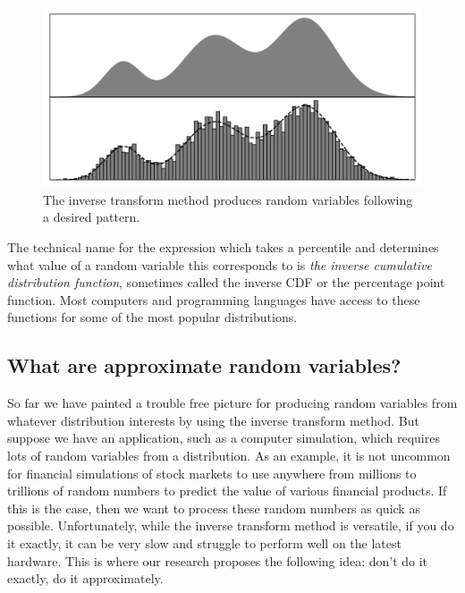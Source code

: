 \documentclass[11pt,a4paper,oneside,english]{extarticle}
\begin{document}
\begin{figure}[htb]
\centering
\includegraphics[width=0.7\linewidth, clip=true, trim={5mm, 2mm, 5mm, 5mm}]{inverse_cdf_transformation_method_schematic_simplified}
\caption[The inverse transform method]{The inverse transform method produces random variables following a desired pattern.}
\label{fig:inverse_cdf_transformation_method_schematic_simplified}
\end{figure}

The technical name for the expression which takes a percentile and determines what value of a random variable this corresponds to is \emph{the inverse cumulative distribution function}, sometimes called the inverse CDF or the percentage point function. Most computers and programming languages have access to these functions for some of the most popular distributions. 

\subsection{What are approximate random variables?}
\label{sec:what_are_approximate_random_variables}

So far we have painted a trouble free picture for producing random variables from whatever distribution interests by using the inverse transform method. But suppose we have an application, such as a computer simulation, which requires lots of random variables from a distribution. As an example, it is not uncommon for financial simulations of stock markets to use anywhere from millions to trillions of random numbers to predict the value of various financial products. If this is the case, then we want to process these random numbers as quick as possible. Unfortunately, while the inverse transform method is versatile, if you do it exactly, it can be very slow and struggle to perform well on the latest hardware. This is where our research proposes the following idea: don't do it exactly, do it approximately. 
\end{document}

